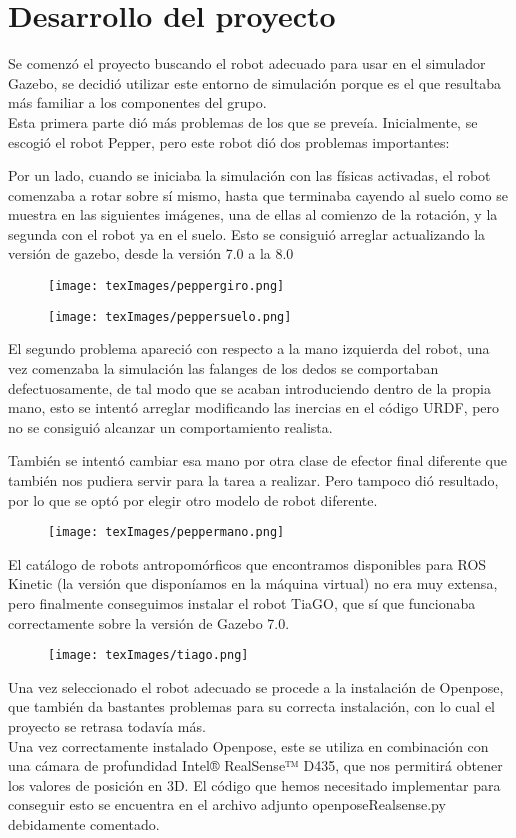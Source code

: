 \usepackage{graphicx}
\section{Desarrollo del proyecto}
Se comenzó el proyecto buscando el robot adecuado para usar en el simulador Gazebo, se decidió utilizar este entorno de simulación porque es el que resultaba más familiar a los componentes del grupo.\\
Esta primera parte dió más problemas de los que se preveía. 
Inicialmente, se escogió el robot Pepper, pero este robot dió dos problemas importantes:
\begin{itemize}
Por un lado, cuando se iniciaba la simulación con las físicas activadas, el robot comenzaba a rotar sobre sí mismo, hasta que terminaba cayendo al suelo como se muestra en las siguientes imágenes, una de ellas al comienzo de la rotación, y la segunda con el robot ya en el suelo. Esto se consiguió arreglar actualizando la versión de gazebo, desde la versión 7.0 a la 8.0
\begin{figure}
  \texttt{[image: texImages/peppergiro.png]}
\end{figure}
\begin{figure}
  \texttt{[image: texImages/peppersuelo.png]}
\end{figure}
El segundo problema apareció con respecto a la mano izquierda del robot, una vez comenzaba la simulación las falanges de los dedos se comportaban defectuosamente, de tal modo que se acaban introduciendo dentro de la propia mano, esto se intentó arreglar modificando las inercias en el código URDF, pero no se consiguió alcanzar un comportamiento realista.\\
\end{itemize}
También se intentó cambiar esa mano por otra clase de efector final diferente que también nos pudiera servir para la tarea a realizar. Pero tampoco dió resultado, por lo que se optó por elegir otro modelo de robot diferente.\\
\begin{figure}
  \texttt{[image: texImages/peppermano.png]}
\end{figure}
El catálogo de robots antropomórficos que encontramos disponibles para ROS Kinetic (la versión que disponíamos en la máquina virtual) no era muy extensa, pero finalmente conseguimos instalar el robot TiaGO, que sí que funcionaba correctamente sobre la versión de Gazebo 7.0.\\
\begin{figure}
  \texttt{[image: texImages/tiago.png]}
\end{figure}
Una vez seleccionado el robot adecuado se procede a la instalación de Openpose, que también da bastantes problemas para su correcta instalación, con lo cual el proyecto se retrasa todavía más.\\
Una vez correctamente instalado Openpose, este se utiliza en combinación con una cámara de profundidad Intel® RealSense™ D435, que nos permitirá obtener los valores de posición en 3D. El código que hemos necesitado implementar para conseguir esto se encuentra en el archivo adjunto openposeRealsense.py debidamente comentado.\\
